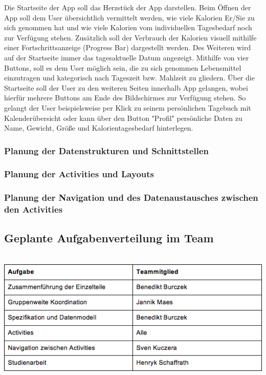Die Startseite der App soll das Herzstück der App darstellen. Beim Öffnen der App soll dem User übersichtlich vermittelt werden, wie viele Kalorien Er/Sie zu sich genommen hat und wie viele Kalorien vom individuellen Tagesbedarf noch zur Verfügung stehen. Zusätzlich soll der Verbrauch der Kalorien visuell mithilfe einer Fortschrittsanzeige (Progress Bar) dargestellt werden. Des Weiteren wird auf der Startseite immer das tagesaktuelle Datum angezeigt. Mithilfe von vier Buttons, soll es dem User möglich sein, die zu sich genommen Lebensmittel einzutragen und kategorisch nach Tageszeit bzw. Mahlzeit zu gliedern. Über die Startseite soll der User zu den weiteren Seiten innerhalb App gelangen, wobei hierfür mehrere Buttons am Ende des Bildschirmes zur Verfügung stehen. So gelangt der User beispielsweise per Klick zu seinem persönlichen Tagebuch mit Kalenderübersicht oder kann über den Button "Profil" persönliche Daten zu Name, Gewicht, Größe und Kalorientagesbedarf hinterlegen.


\subsubsection{Planung der Datenstrukturen und Schnittstellen}

\subsubsection{Planung der Activities und Layouts}

\subsubsection{Planung der Navigation und des Datenaustausches zwischen den Activities }

\subsection{Geplante Aufgabenverteilung im Team}\\

\includegraphics[scale=0.8]{img/geplanteAugabenVerteilung}\\
